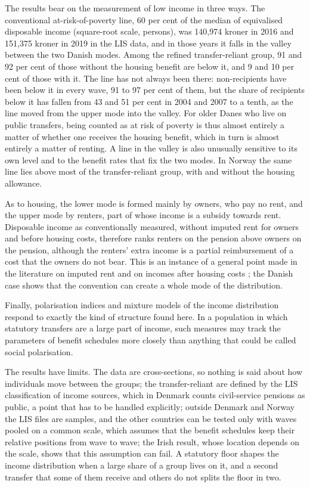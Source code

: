 The results bear on the measurement of low income in three ways. The conventional at-risk-of-poverty line, 60 per cent of the median of equivalised disposable income (square-root scale, persons), was 140{,}974 kroner in 2016 and 151{,}375 kroner in 2019 in the LIS data, and in those years it falls in the valley between the two Danish modes. Among the refined transfer-reliant group, 91 and 92 per cent of those without the housing benefit are below it, and 9 and 10 per cent of those with it. The line has not always been there: non-recipients have been below it in every wave, 91 to 97 per cent of them, but the share of recipients below it has fallen from 43 and 51 per cent in 2004 and 2007 to a tenth, as the line moved from the upper mode into the valley. For older Danes who live on public transfers, being counted as at risk of poverty is thus almost entirely a matter of whether one receives the housing benefit, which in turn is almost entirely a matter of renting. A line in the valley is also unusually sensitive to its own level and to the benefit rates that fix the two modes. In Norway the same line lies above most of the transfer-reliant group, with and without the housing allowance.

As to housing, the lower mode is formed mainly by owners, who pay no rent, and the upper mode by renters, part of whose income is a subsidy towards rent. Disposable income as conventionally measured, without imputed rent for owners and before housing costs, therefore ranks renters on the pension above owners on the pension, although the renters' extra income is a partial reimbursement of a cost that the owners do not bear. This is an instance of a general point made in the literature on imputed rent and on incomes after housing costs \citep{FrickGrabka2003,FrickGrabkaSmeedingTsakloglou2010,CanberraHandbook2011,List2023}; the Danish case shows that the convention can create a whole mode of the distribution.

Finally, polarisation indices \citep{EstebanRay1994,DuclosEstebanRay2004} and mixture models of the income distribution \citep{PittauZelliJohnson2010} respond to exactly the kind of structure found here. In a population in which statutory transfers are a large part of income, such measures may track the parameters of benefit schedules more closely than anything that could be called social polarisation.

The results have limits. The data are cross-sections, so nothing is said about how individuals move between the groups; the transfer-reliant are defined by the LIS classification of income sources, which in Denmark counts civil-service pensions as public, a point that has to be handled explicitly; outside Denmark and Norway the LIS files are samples, and the other countries can be tested only with waves pooled on a common scale, which assumes that the benefit schedules keep their relative positions from wave to wave; the Irish result, whose location depends on the scale, shows that this assumption can fail. A statutory floor shapes the income distribution when a large share of a group lives on it, and a second transfer that some of them receive and others do not splits the floor in two.
